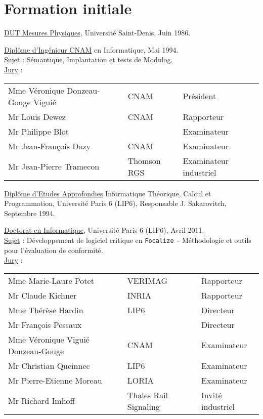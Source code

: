 \documentclass[a4paper,12pt]{article}
\newcommand{\Focal}{{\tt Focalize}}
\newcommand{\smallspace}{\vspace{0.25cm}}
\begin{document}
\newpage
\section{Formation initiale}

\hspace{-0.6cm}\underline{DUT Mesures Physiques}, Universit\'e Saint-Denis, Juin 1986.

\smallspace
\hspace{-0.6cm}\underline{Dipl\^ome d'Ing\'enieur CNAM} en Informatique, Mai 1994.
\\
\underline{Sujet} : S\'emantique, Implantation et tests de Modulog.
\\
\underline{Jury} :
\begin{tabular}{lll}
  Mme V\'eronique Donzeau-Gouge Vigui\'e & CNAM & Pr\'esident  \\
  Mr Louis Dewez & CNAM & Rapporteur \\
  Mr Philippe Blot & & Examinateur \\
  Mr Jean-Fran\c{c}ois Dazy & CNAM & Examinateur \\
  Mr Jean-Pierre Tramecon & Thomson RGS & Examinateur industriel \\
\end{tabular}

\smallspace
\hspace{-0.6cm}\underline{Dipl\^ome d'Etudes Approfondies} Informatique Th\'eorique,
Calcul et Programmation, Universit\'e Paris 6 (LIP6), Responsable
J. Sakarovitch, Septembre 1994.

\smallspace
\hspace{-0.6cm}\underline{Doctorat en Informatique}, Universit\'e Paris 6 (LIP6),
Avril 2011. 
\\
\underline{Sujet} : D\'eveloppement de logiciel critique en \Focal\ -
M\'ethodologie et outils pour l'\'evaluation de conformit\'e.
\\
\underline{Jury} :
\begin{tabular}{lll}
  Mme Marie-Laure Potet & VERIMAG & Rapporteur \\
  Mr Claude Kichner & INRIA & Rapporteur \\
  Mme Th\'er\`ese Hardin & LIP6 & Directeur \\
  Mr Fran\c{c}ois Pessaux & & Directeur \\
  Mme V\'eronique Vigui\'e Donzeau-Gouge & CNAM & Examinateur \\
  Mr Christian Queinnec & LIP6 & Examinateur \\
  Mr Pierre-Etienne Moreau & LORIA & Examinateur \\
  Mr Richard Imhoff & Thales Rail Signaling & Invit\'e industriel\\
\end{tabular}
\end{document}

